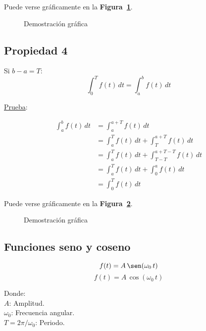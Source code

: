 Puede verse gráficamente en la \textbf{Figura~\ref{figura_04}}.
\begin{figure}[H]
    \centering
    
    \caption{Demostración gráfica}\label{figura_04}
\end{figure}

\subsection*{Propiedad 4}
Si $b-a=T$:
\begin{equation}
    \int_{0}^{T}f(t)\,dt=\int_{a}^{b}f(t)\,dt
\label{propiedad4}
\end{equation}

\underline{Prueba}:

\begin{equation*}
\begin{split}
    \int_{a}^{b}f(t)\,dt
        &=\int_{a}^{a+T}f(t)\,dt\\
        &=\int_{a}^{T}f(t)\,dt+\int_{T}^{a+T}f(t)\,dt\\
        &=\int_{a}^{T}f(t)\,dt+\int_{T-T}^{a+T-T}f(t)\,dt\\
        &=\int_{a}^{T}f(t)\,dt+\int_{0}^{a}f(t)\,dt\\
        &=\int_{0}^{T}f(t)\,dt
\end{split}
\end{equation*}

Puede verse gráficamente en la \textbf{Figura~\ref{figura_05}}.
\begin{figure}[H]
    \centering
    
    \caption{Demostración gráfica}\label{figura_05}
\end{figure}

\subsection{Funciones seno y coseno}
\begin{equation*}
    f(t)=A\,\sen(\omega_0\,t)
\end{equation*}
\begin{equation*}
    f(t)=A\,\cos(\omega_0\,t)
\end{equation*}

Donde:\\
\indent\indent$A$: Amplitud.\\
\indent\indent$\omega_0$: Frecuencia angular.\\
\indent\indent$T=2\pi/\omega_0$: Periodo.\\

